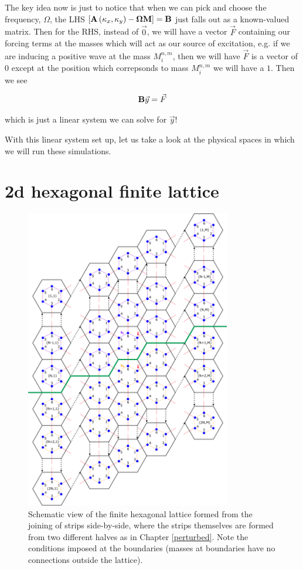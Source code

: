 The key idea now is just to notice that when we can pick and choose the
frequency, $\Omega$, the LHS
$\left[\mathbf{A}\left(\kappa_{x},\kappa_{y}\right)-\mathbf{\Omega}\mathbf{M}\right]=\mathbf{B}$
just falls out as a known-valued matrix. Then for the RHS, instead of
$\vec{0}$, we will have a vector $\vec{F}$ containing our forcing terms at the
masses which will act as our source of excitation, e.g. if we are inducing a
positive wave at the mass $M_i^{n,m}$, then we will have $\vec{F}$ is a vector
of $0$ except at the position which correpsonds to mass $M_i^{n,m}$ we will
have a $1$. Then we see

\begin{align}
  \mathbf{B}\vec{y}=\vec{F}
\end{align}

which is just a linear system we can solve for $\vec{y}$!

With this linear system set up, let us take a look at the physical spaces in
which we will run these simulations.

\section{2d hexagonal finite lattice}
\begin{figure}[!h]
\centering
\includegraphics[width=0.8\textwidth]{imgs/hexfinitemodel.png}
\caption{\label{fig:hexfinscheme} Schematic view of the finite hexagonal
  lattice formed from the joining of strips side-by-side, where the strips
  themselves are formed from two different halves as in Chapter
  \ref{perturbed}. Note the conditions imposed at the boundaries (masses at
  boundaries have no connections outside the lattice).}
\end{figure}

